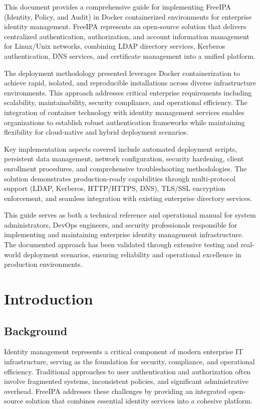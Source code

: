 \documentclass[12pt,a4paper]{report}
\begin{document}
This document provides a comprehensive guide for implementing FreeIPA (Identity, Policy, and Audit) in Docker containerized environments for enterprise identity management. FreeIPA represents an open-source solution that delivers centralized authentication, authorization, and account information management for Linux/Unix networks, combining LDAP directory services, Kerberos authentication, DNS services, and certificate management into a unified platform.

The deployment methodology presented leverages Docker containerization to achieve rapid, isolated, and reproducible installations across diverse infrastructure environments. This approach addresses critical enterprise requirements including scalability, maintainability, security compliance, and operational efficiency. The integration of container technology with identity management services enables organizations to establish robust authentication frameworks while maintaining flexibility for cloud-native and hybrid deployment scenarios.

Key implementation aspects covered include automated deployment scripts, persistent data management, network configuration, security hardening, client enrollment procedures, and comprehensive troubleshooting methodologies. The solution demonstrates production-ready capabilities through multi-protocol support (LDAP, Kerberos, HTTP/HTTPS, DNS), TLS/SSL encryption enforcement, and seamless integration with existing enterprise directory services.

This guide serves as both a technical reference and operational manual for system administrators, DevOps engineers, and security professionals responsible for implementing and maintaining enterprise identity management infrastructure. The documented approach has been validated through extensive testing and real-world deployment scenarios, ensuring reliability and operational excellence in production environments.

\chapter{Introduction}

\section{Background}

Identity management represents a critical component of modern enterprise IT infrastructure, serving as the foundation for security, compliance, and operational efficiency. Traditional approaches to user authentication and authorization often involve fragmented systems, inconsistent policies, and significant administrative overhead. FreeIPA addresses these challenges by providing an integrated open-source solution that combines essential identity services into a cohesive platform.
\end{document}
